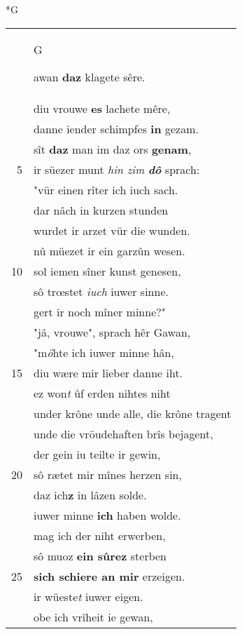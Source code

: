 \documentclass[8pt,a4paper,notitlepage]{article}
\begin{document}
\begin{table}[ht]
\begin{minipage}[t]{0.5\linewidth}
\small
\begin{center}*G
\end{center}
\begin{tabular}{rl}
 & \begin{large}G\end{large}awan \textbf{daz} klagete sêre.\\ 
 & diu vrouwe \textbf{es} lachete mêre,\\ 
 & danne iender schimpfes \textbf{in} gezam.\\ 
 & sît \textbf{daz} man im daz ors \textbf{genam},\\ 
5 & ir süezer munt \textit{hin zim} \textit{\textbf{dô}} sprach:\\ 
 & "vür einen rîter ich iuch sach.\\ 
 & dar nâch in kurzen stunden\\ 
 & wurdet ir arzet vür die wunden.\\ 
 & nû müezet ir ein garzûn wesen.\\ 
10 & sol iemen sîner kunst genesen,\\ 
 & sô trœstet \textit{iuch} iuwer sinne.\\ 
 & gert ir noch mîner minne?"\\ 
 & "jâ, vrouwe", sprach hêr Gawan,\\ 
 & "m\textit{ö}hte ich iuwer minne hân,\\ 
15 & diu wære mir lieber danne iht.\\ 
 & ez won\textit{t} ûf erden nihtes niht\\ 
 & under krône unde alle, die krône tragent\\ 
 & unde die vröudehaften brîs bejagent,\\ 
 & der gein iu teilte ir gewin,\\ 
20 & sô rætet mir mînes herzen sin,\\ 
 & daz ich\textbf{z} in lâzen solde.\\ 
 & iuwer minne \textbf{ich} haben wolde.\\ 
 & mag ich der niht erwerben,\\ 
 & sô muoz \textbf{ein sûrez} sterben\\ 
25 & \textbf{sich schiere an mir} erzeigen.\\ 
 & ir wüeste\textit{t} iuwer eigen.\\ 
 & obe ich vrîheit ie gewan,\\ 

\end{tabular}
\end{minipage}
\end{table}
\end{document}

